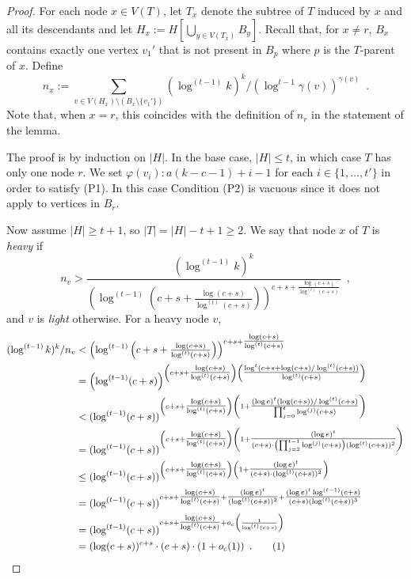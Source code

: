 \documentclass[kpfonts]{patmorin}
\newcommand\numberthis{\addtocounter{equation}{1}\tag{\theequation}}
\theoremstyle{named}
\begin{document}
\begin{proof}
    For each node $x\in V(T)$, let $T_x$ denote the subtree of $T$ induced by $x$ and all its descendants and let $H_x:=H[\bigcup_{y\in V(T_x)} B_y]$. Recall that, for $x\neq r$, $B_x$ contains exactly one vertex $v_1'$ that is not present in $B_p$ where $p$ is the $T$-parent of $x$.  Define
    \[
        n_x:=\sum_{v\in V(H_x)\setminus (B_x\setminus \{v_1'\})}(\log^{(t-1)} k)^k/(\log^{t-1}\gamma(v))^{\gamma(v)} \enspace .
    \]
    Note that, when $x=r$, this coincides with the definition of $n_r$ in the statement of the lemma.

    The proof is by induction on $|H|$.  In the base case, $|H|\le t$, in which case $T$ has only one node $r$. We set $\varphi(v_i):a(k-c-1)+i-1$ for each $i\in\{1,\ldots,t'\}$ in order to satisfy (P1).  In this case Condition (P2) is vacuous since it does not apply to vertices in $B_r$.

    Now assume $|H|\ge t+1$, so $|T|=|H|-t+1\ge 2$.  We say that node $x$ of $T$ is \emph{heavy} if
    \[
        n_v > \frac{(\log^{(t-1)} k)^k}{\left(\log^{(t-1)}\left(c+s+\tfrac{\log(c+s)}{\log^{(t)}(c+s)}\right)\right)^{c+s+\tfrac{\log(c+s)}{\log^{(t)}(c+s)}}} \enspace ,
    \]
    and $v$ is \emph{light} otherwise.  For a heavy node $v$,
    \begin{align*}
        (\log^{(t-1)} k)^k/n_v & < \left(\log^{(t-1)}\left(c+s+\tfrac{\log(c+s)}{\log^{(t)}(c+s)}\right)\right)^{c+s+\tfrac{\log(c+s)}{\log^{(t)}(c+s)}} \\
        & = \left(\log^{(t-1)}(c+s)\right)^{\left(c+s+\tfrac{\log(c+s)}{\log^{(t)}(c+s)}\right)
            \left(\tfrac{\log^{t}(c+s+\log(c+s)/\log^{(t)}(c+s))}{\log^{(t)}(c+s)}\right)} \\
        & < (\log^{(t-1)}(c+s))^{\left(c+s+\tfrac{\log(c+s)}{\log^{(t)}(c+s)}\right)
            \left(1 + \tfrac{(\log e)^t(\log(c+s))/\log^{(t)}(c+s)}{\prod_{j=0}^{t}\log^{(j)}(c+s)}\right)} \\
        & = (\log^{(t-1)}(c+s))^{\left(c+s+\tfrac{\log(c+s)}{\log^{(t)}(c+s)}\right)
            \left(1 + \tfrac{(\log e)^t}{(c+s)\cdot\left(\prod_{j=2}^{t-1}\log^{(j)}(c+s)\right)(\log^{(t)}(c+s))^2}\right)} \\
        & \le (\log^{(t-1)}(c+s))^{\left(c+s+\tfrac{\log(c+s)}{\log^{(t)}(c+s)}\right)
            \left(1 + \tfrac{(\log e)^t}{(c+s)\cdot(\log^{(t)}(c+s))^2}\right)} \\
        & = (\log^{(t-1)}(c+s))^{c+s+\tfrac{\log(c+s)}{\log^{(t)}(c+s)} +
            \tfrac{(\log e)^t}{(\log^{(t)}(c+s))^2} + \tfrac{(\log e)^t\log^{(t-1)}(c+s)}{(c+s)(\log^{(t)}(c+s))^3}}  \\
        & = (\log^{(t-1)}(c+s))^{c+s+\tfrac{\log(c+s)}{\log^{(t)}(c+s)} + o_c\left(\frac{1}{\log^{(t)}(c+s)}\right)}  \\
        & = (\log(c+s))^{c+s}\cdot (c+s)\cdot (1+o_c(1)) \enspace .
        \numberthis \label{sizer}
    \end{align*}


\end{proof}
\end{document}
